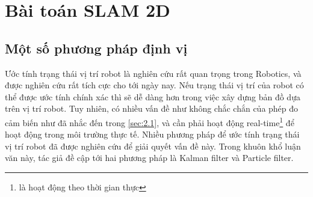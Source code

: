 {\section{Bài toán SLAM 2D}






\subsection{Một số phương pháp định vị}

Ước tính trạng thái vị trí robot là nghiên cứu rất quan trọng trong Robotics, và được nghiên cứu rất tích cực cho tới ngày nay. Nếu trạng thái vị trí của robot có thể được ước tính chính xác thì sẽ dễ dàng hơn trong việc xây dựng bản đồ dựa trên vị trí robot. Tuy nhiên, có nhiều vấn đề như không chắc chắn của phép đo cảm biến như đã nhắc đến trong \ref{sec:2.1}, và cần phải hoạt động real-time\footnote{là hoạt động theo thời gian thực} để hoạt động trong môi trường thực tế. Nhiều phương pháp để ước tính trạng thái vị trí robot đã được nghiên cứu để giải quyết vấn đề này. Trong khuôn khổ luận văn này, tác giả đề cập tới hai phương pháp là Kalman filter và Particle filter.

}
